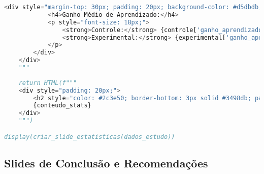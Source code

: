 \begin{pythonbox}
\begin{lstlisting}[language=Python]       
        <div style="margin-top: 30px; padding: 20px; background-color: #d5dbdb; border-radius: 5px;">
            <h4>Ganho Médio de Aprendizado:</h4>
            <p style="font-size: 18px;">
                <strong>Controle:</strong> {controle['ganho_aprendizado'].mean():.2f} ± {controle['ganho_aprendizado'].std():.2f}<br>
                <strong>Experimental:</strong> {experimental['ganho_aprendizado'].mean():.2f} ± {experimental['ganho_aprendizado'].std():.2f}
            </p>
        </div>
    </div>
    """
    
    return HTML(f"""
    <div style="padding: 20px;">
        <h2 style="color: #2c3e50; border-bottom: 3px solid #3498db; padding-bottom: 10px; margin-bottom: 30px; text-align: center;">Resultados Estatísticos</h2>
        {conteudo_stats}
    </div>
    """)

display(criar_slide_estatisticas(dados_estudo))
\end{lstlisting}
\end{pythonbox}

\subsection{Slides de Conclusão e Recomendações}

